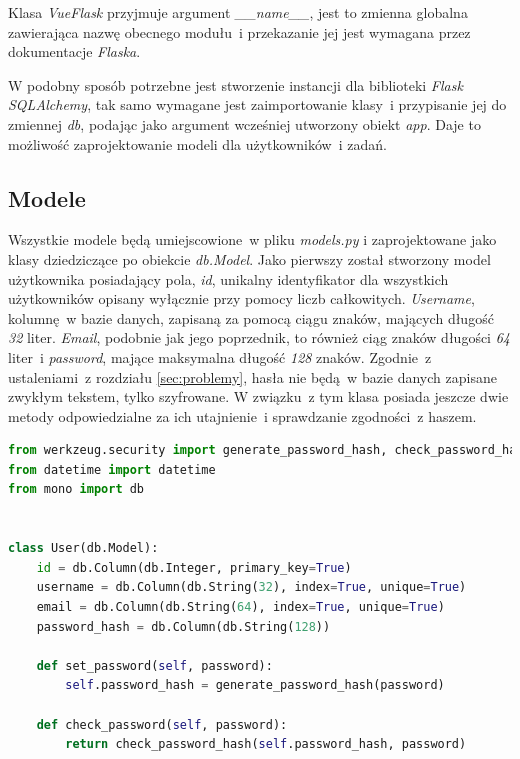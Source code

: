 Klasa \textit{VueFlask} przyjmuje argument \textit{\_\_name\_\_}, jest to zmienna globalna zawierająca nazwę obecnego modułu~i przekazanie jej jest wymagana przez dokumentacje \textit{Flaska}\cite{flask}.

W podobny sposób potrzebne jest stworzenie instancji dla biblioteki \textit{Flask SQLAlchemy}, tak samo wymagane jest zaimportowanie klasy~i przypisanie jej do zmiennej \textit{db}, podając jako argument wcześniej utworzony obiekt \textit{app}. Daje to możliwość zaprojektowanie modeli dla użytkowników~i zadań.

\subsection{Modele}
Wszystkie modele będą umiejscowione~w pliku \textit{models.py} i zaprojektowane jako klasy dziedziczące po obiekcie \textit{db.Model}\cite{flasksql}. Jako pierwszy został stworzony model użytkownika posiadający pola, \textit{id}, unikalny identyfikator dla wszystkich użytkowników opisany wyłącznie przy pomocy liczb całkowitych. \textit{Username}, kolumnę~w bazie danych, zapisaną za pomocą ciągu znaków, mających długość \textit{32} liter. \textit{Email}, podobnie jak jego poprzednik, to również ciąg znaków długości \textit{64} liter~i \textit{password}, mające maksymalna długość \textit{128} znaków. Zgodnie~z ustaleniami~z rozdziału \ref{sec:problemy}, hasła nie będą~w bazie danych zapisane zwykłym tekstem, tylko szyfrowane. W związku~z tym klasa posiada jeszcze dwie metody odpowiedzialne za ich utajnienie~i sprawdzanie zgodności~z haszem\cite{Ziade:2018}. 
\begin{lstlisting}[language=Python, caption={Klasa odpowiedzialna za model użytkownika.}]
from werkzeug.security import generate_password_hash, check_password_hash
from datetime import datetime
from mono import db


class User(db.Model):
    id = db.Column(db.Integer, primary_key=True)
    username = db.Column(db.String(32), index=True, unique=True)
    email = db.Column(db.String(64), index=True, unique=True)
    password_hash = db.Column(db.String(128))

    def set_password(self, password):
        self.password_hash = generate_password_hash(password)

    def check_password(self, password):
        return check_password_hash(self.password_hash, password)
\end{lstlisting}

